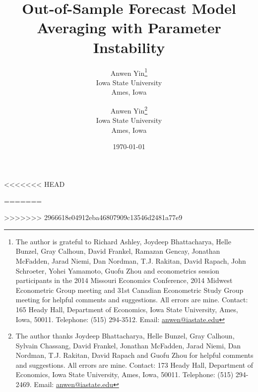 
\title{Out-of-Sample Forecast Model Averaging with Parameter Instability}
<<<<<<< HEAD
\author{Anwen Yin\thanks{The author is grateful to Richard Ashley, Joydeep Bhattacharya, Helle Bunzel, Gray Calhoun, David Frankel, Ramazan Gencay, Jonathan McFadden, Jarad Niemi, Dan Nordman, T.J. Rakitan, David Rapach, John Schroeter, Yohei Yamamoto, Guofu Zhou and econometrics session participants in the 2014 Missouri Economics Conference, 2014 Midwest Econometric Group meeting and 31st Canadian Econometric Study Group meeting for helpful comments and suggestions. All errors are mine. Contact: 165 Heady Hall, Department of Economics, Iowa State University, Ames, Iowa, 50011. Telephone: (515) 294-3512. Email: \href{mailto:anwen@iastate.edu}{anwen@iastate.edu}} \\ Iowa State University\\Ames, Iowa}
=======
\author{Anwen Yin\thanks{The author thanks Joydeep Bhattacharya, Helle Bunzel, Gray Calhoun, Sylvain Chassang, David Frankel, Jonathan McFadden, Jarad Niemi, Dan Nordman, T.J. Rakitan, David Rapach and Guofu Zhou for helpful comments and suggestions. All errors are mine. Contact: 173 Heady Hall, Department of Economics, Iowa State University, Ames, Iowa, 50011. Telephone: (515) 294-2469. Email: \href{mailto:anwen@iastate.edu}{anwen@iastate.edu}} \\ Iowa State University\\Ames, Iowa}
>>>>>>> 2966618e04912eba46807909c13546d2481a77e9
\date{\today}

\maketitle

